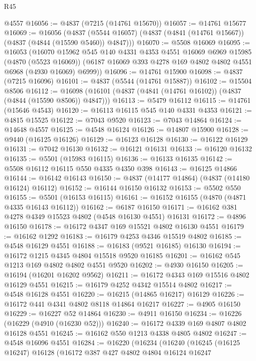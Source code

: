 \begin{lexlean}{R45}
\begin{coremodule}
    @4557
@16056 := @4837 (@7215 (@14761 @15670))
@16057 := @14761 @15677
@16069 := @16056
    (@4837 (@5544 @16057) (@4837 (@4841 (@14761 @15667)) (@4837 (@4844 (@15590 @5460)) @4847)))
@16070 := @5508 @16069
@16095 := @16053
    (@16070
      @15962
      @545
      @140
      @4331
      @4353
      @4551
      @16069
      @6969
      @15985
      (@4870 (@5523 @16069))
      (@6187 @16069 @393 @4278 @169 @4802 @4802 @4551 @6968 (@4930 @16069) @6999))
@16096 := @14761 @15900
@16098 := @4837 (@7215 @16096)
@16101 := @4837 (@5544 (@14761 @15887))
@16102 := @15504 @8506
@16112 := @16098 (@16101 (@4837 (@4841 (@14761 @16102)) (@4837 (@4844 (@15590 @8506)) @4847)))
@16113 := @5479 @16112
@16115 := @14761 (@15646 @4543)
@16120 := @16113 @16115 @545 @140 @4331 @4353
@16121 := @4815 @15525
@16122 := @7043 @9520
@16123 := @7043 @14864
@16124 := @14648 @4557
@16125 := @4548 @16124
@16126 := @14807 @15900
@16128 := @9440 (@16125 @16126)
@16129 := @16123 @16128
@16130 := @16122 @16129
@16131 := @7042 @16130
@16132 := @16121 @16131
@16133 := @16120 @16132
@16135 := @5501 (@15983 @16115)
@16136 := @16133 @16135
@16142 := @5508 @16112 @16115 @550 @4335 @4350 @398
@16143 := @16125 @14866
@16144 := @16142 @16143
@16150 := @4837 (@14177 @14864) (@4837 (@14180 @16124) @16112)
@16152 := @16144 @16150 @16132
@16153 := @5502 @550
@16155 := @5501 (@16153 @16115)
@16161 := @16152 @16155 (@4870 (@4871 @4335 @16143 @16112))
@16162 := @6187 @16150
@16171 := @16162 @381 @4278 @4349 @15523 @4802 (@4548 @16130 @4551) @16131
@16172 := @4896 @16150
@16178 := @16172 @4347 @169 @15521 @4802 @16130 @4551
@16179 := @16162 @1292
@16183 := @16179 @4253 @4346 @15519 @4802
@16185 := @4548 @16129 @4551
@16188 := @16183 (@9521 @16185) @16130
@16194 := @16172 @1215 @4345 @4804 @15518 @9520 @16185
@16201 := @16162 @545 @1213 @169 @4802 @4802 @4551 @9520
@16202 := @4930 @16150
@16205 := @16194 (@16201 @16202 @9562)
@16211 := @16172 @4343 @169 @15516 @4802 @16129 @4551
@16215 := @16179 @4252 @4342 @15514 @4802
@16217 := @4548 @16128 @4551
@16220 := @16215 (@14865 @16217) @16129
@16226 := @16172 @441 @4341 @4802 @8118 @14864 @16217
@16227 := @4905 @16150
@16229 := @16227 @52 @14864
@16230 := @4911 @16150
@16234 := @16226 (@16229 (@4910 (@16230 @52)))
@16240 := @16172 @4339 @169 @4807 @4802 @16128 @4551
@16245 := @16162 @550 @1213 @4338 @4805 @4802
@16247 := @4548 @16096 @4551
@16284 := @16220
    (@16234
      (@16240
        (@16245
          (@16125 @16247)
          @16128
          (@16172
            @387
            @427
            @4802
            @4804
            @16124
            @16247

\end{coremodule}
\end{lexlean}
